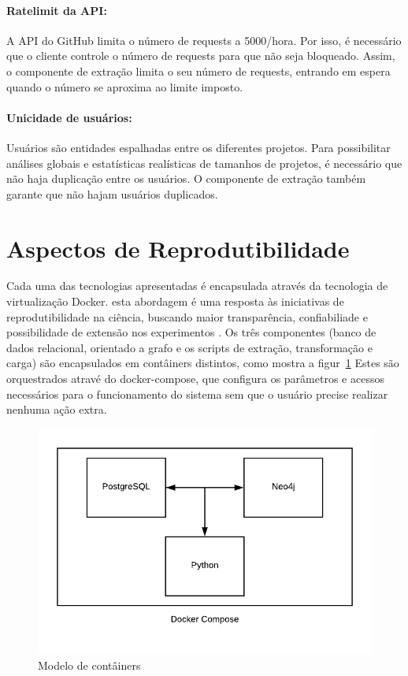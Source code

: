 \documentclass[a4paper,12pt]{monografia}
\theoremstyle{plain}
\theoremstyle{definition}
\theoremstyle{remark}
\begin{document}
\paragraph{Ratelimit da API: } A API do GitHub limita o número de requests a 5000/hora. Por isso, é necessário que o cliente controle o número de requests para que não seja bloqueado. Assim, o componente de extração limita o seu número de requests, entrando em espera quando o número se aproxima ao limite imposto.

\paragraph{Unicidade de usuários: } Usuários são entidades espalhadas entre os diferentes projetos. Para possibilitar análises globais e estatísticas realísticas de tamanhos de projetos, é necessário que não haja duplicação entre os usuários. O componente de extração também garante que não hajam usuários duplicados.



\section{Aspectos de Reprodutibilidade}

Cada uma das tecnologias apresentadas é encapsulada através da tecnologia de virtualização Docker. esta abordagem é uma resposta às iniciativas de reprodutibilidade na ciência, buscando maior transparência, confiabiliade e possibilidade de extensão nos experimentos \cite{freire2012}. Os três componentes (banco de dados relacional, orientado a grafo e os scripts de extração, transformação e carga) são encapsulados em contâiners distintos, como mostra a figur~\ref{fig:docker-model} Estes são orquestrados atravé do docker-compose, que configura os parâmetros e acessos necessários para o funcionamento do sistema sem que o usuário precise realizar nenhuma ação extra.

\begin{figure}[!htbp]
 \includegraphics[width=\textwidth]{docker-model}
 \caption{Modelo de contâiners}\label{fig:docker-model}
\end{figure}
\end{document}

